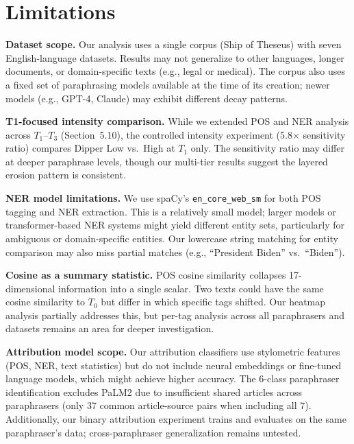 \section{Limitations}

\textbf{Dataset scope.} Our analysis uses a single corpus (Ship of Theseus) with seven English-language datasets. Results may not generalize to other languages, longer documents, or domain-specific texts (e.g., legal or medical). The corpus also uses a fixed set of paraphrasing models available at the time of its creation; newer models (e.g., GPT-4, Claude) may exhibit different decay patterns.

\textbf{T1-focused intensity comparison.} While we extended POS and NER analysis across $T_1$--$T_3$ (Section~5.10), the controlled intensity experiment (5.8$\times$ sensitivity ratio) compares Dipper Low vs.\ High at $T_1$ only. The sensitivity ratio may differ at deeper paraphrase levels, though our multi-tier results suggest the layered erosion pattern is consistent.

\textbf{NER model limitations.} We use spaCy's \texttt{en\_core\_web\_sm} for both POS tagging and NER extraction. This is a relatively small model; larger models or transformer-based NER systems might yield different entity sets, particularly for ambiguous or domain-specific entities. Our lowercase string matching for entity comparison may also miss partial matches (e.g., ``President Biden'' vs.\ ``Biden'').

\textbf{Cosine as a summary statistic.} POS cosine similarity collapses 17-dimensional information into a single scalar. Two texts could have the same cosine similarity to $T_0$ but differ in which specific tags shifted. Our heatmap analysis partially addresses this, but per-tag analysis across all paraphrasers and datasets remains an area for deeper investigation.

\textbf{Attribution model scope.} Our attribution classifiers use stylometric features (POS, NER, text statistics) but do not include neural embeddings or fine-tuned language models, which might achieve higher accuracy. The 6-class paraphraser identification excludes PaLM2 due to insufficient shared articles across paraphrasers (only 37 common article-source pairs when including all 7). Additionally, our binary attribution experiment trains and evaluates on the same paraphraser's data; cross-paraphraser generalization remains untested.
